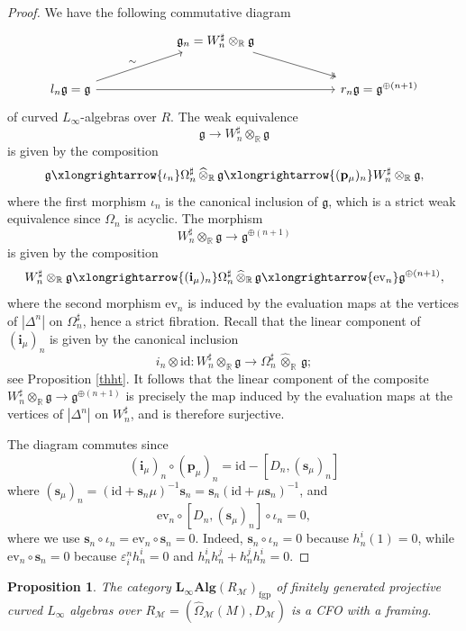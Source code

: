 \documentclass[12pt]{amsart}
\newtheorem{prop}[defn]{Proposition}
\numberwithin{equation}{section}
\theoremstyle{plain}
\newcommand{\bfi}{\mathbf{i}}
\newcommand{\bfp}{\mathbf{p}}
\newcommand{\bfs}{\mathbf{s}}
\newcommand{\fg}{\mathfrak{g}}
\newcommand{\sM}{\mathcal{M}}
\newcommand{\R}{\mathbb{R}}
\newcommand{\ev}{\mathrm{ev}}
\newcommand{\id}{\mathrm{id}}
\newcommand{\wOmega}{\widehat{\Omega}}
\begin{document}
	\begin{proof}
		We have the following commutative diagram
		\[
		\begin{tikzcd}[row sep=20pt, column sep=60pt]
			& \fg_n = W_n^\sharp \otimes_\R \fg
			\arrow[dr, two heads]
			& \\
			l_n \fg =\fg
			\arrow[ur, "\sim"]
			\arrow[rr]
			&&
			r_n \fg =\fg^{\oplus (n+1)}
		\end{tikzcd}
		\]
		of curved $L_\infty$-algebras over $R$. The weak equivalence
		\[
		\fg \longrightarrow W_n^\sharp \otimes_\R \fg
		\]
		is given by the composition
		\[
		\fg \xlongrightarrow{\iota_n} \Omega_n^\sharp \,\widehat{\otimes}_{\R}\, \fg
		\xlongrightarrow{(\bfp_\mu)_n}
		W_n^\sharp \otimes_\R \fg,
		\]
		where the first morphism $\iota_n$ is the canonical inclusion of $\fg$, which is a strict weak equivalence since $\Omega_n$ is acyclic. The morphism
		\[
		W_n^\sharp \otimes_\R \fg \longrightarrow \fg^{\oplus (n+1)}
		\]
		is given by the composition
		\[
		W_n^\sharp \otimes_\R \fg
		\xlongrightarrow{(\bfi_\mu)_n}
		\Omega_n^\sharp \,\widehat{\otimes}_{\R}\, \fg
		\xlongrightarrow{\ev_n}
		\fg^{\oplus (n+1)},
		\]
		where the second morphism $\ev_n$ is induced by the evaluation maps at the vertices of $|\Delta^n|$ on $\Omega_n^\sharp$, hence a strict fibration. Recall that the linear component of $(\bfi_\mu)_n$ is given by the canonical inclusion
		\[
		i_n \otimes \id:
		W_n^\sharp \otimes_\R \fg
		\longrightarrow
		\Omega_n^\sharp \,\widehat{\otimes}_{\R}\, \fg;
		\]
		see Proposition \ref{thht}. It follows that the linear component of the composite 
		$W_n^\sharp \otimes_\R \fg \rightarrow \fg^{\oplus (n+1)}$
		is precisely the map induced by the evaluation maps at the vertices of $|\Delta^n|$ on $W_n^\sharp$, and is therefore surjective.
		
		The diagram commutes since 
		\[
		(\bfi_\mu)_n \circ (\bfp_\mu)_n = \id -[D_n, (\bfs_\mu)_n]
		\]
		where $(\bfs_\mu)_n = (\id + \bfs_n \mu)^{-1}\bfs_n = \bfs_n (\id + \mu \bfs_n)^{-1}$, and
		\[
		\ev_n \circ [D_n, (\bfs_\mu)_n] \circ \iota_n  = 0,
		\]
		where we use $\bfs_n \circ \iota_n = \ev_n \circ \bfs_n = 0$. Indeed, $\bfs_n \circ \iota_n = 0$ because $h^i_n(1)=0$, while $\ev_n \circ \bfs_n = 0$ because $\varepsilon_{i}^n h_n^i = 0$ and $h_n^i h_n^j + h_n^j h_n^i = 0$.
	\end{proof}	
	
	\begin{prop}
		The category $\mathbf{L_\infty Alg}(R_\sM)_{\mathrm{fgp}}$ of finitely generated projective curved $L_\infty$ algebras over $R_\sM=(\wOmega_\sM(M), D_\sM)$ is a CFO with a framing.
	\end{prop}
	
\end{document}
